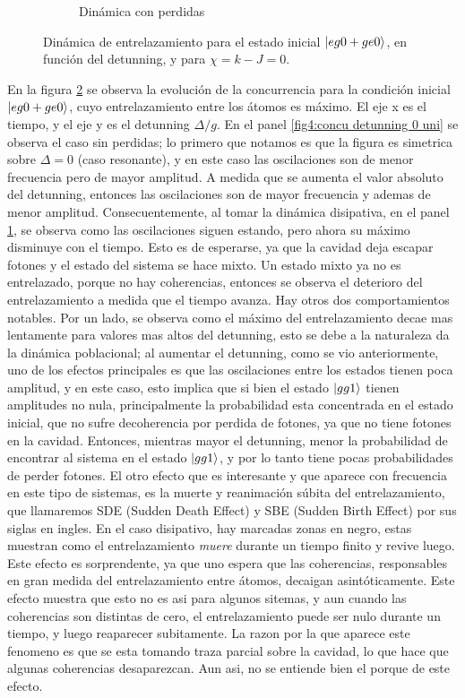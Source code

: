 \begin{figure}[h]
\begin{subfigure}{0.49\textwidth}
        \caption{Dinámica con perdidas}
        \label{fig4:concu detunning 0 dis}
    \end{subfigure}
    \caption{Dinámica de entrelazamiento para el estado inicial $\ket{eg0+ge0}$, en función del detunning, y para $\chi=k-J=0$.}
    \label{fig4:concu detunning 0}
\end{figure}
En la figura \ref{fig4:concu detunning 0} se observa la evolución de la concurrencia para la condición inicial $\ket{eg0+ge0}$, cuyo entrelazamiento entre los átomos es máximo. El eje x es el tiempo, y el eje y es el detunning $\Delta/g$. En el panel \ref{fig4:concu detunning 0 uni} se observa el caso sin perdidas; lo primero que notamos es que la figura es simetrica sobre $\Delta=0$ (caso resonante), y en este caso las oscilaciones son de menor frecuencia pero de mayor amplitud. A medida que se aumenta el valor absoluto del detunning, entonces las oscilaciones son de mayor frecuencia y ademas de menor amplitud. Consecuentemente, al tomar la dinámica disipativa, en el panel \ref{fig4:concu detunning 0 dis}, se observa como las oscilaciones siguen estando, pero ahora su máximo disminuye con el tiempo. Esto es de esperarse, ya que la cavidad deja escapar fotones y el estado del sistema se hace mixto. Un estado mixto ya no es entrelazado, porque no hay coherencias, entonces se observa el deterioro del entrelazamiento a medida que el tiempo avanza. Hay otros dos comportamientos notables. Por un lado, se observa como el máximo del entrelazamiento decae mas lentamente para valores mas altos del detunning, esto se debe a la naturaleza da la dinámica poblacional; al aumentar el detunning, como se vio anteriormente, uno de los efectos principales es que las oscilaciones entre los estados tienen poca amplitud, y en este caso, esto implica que si bien el estado $\ket{gg1}$ tienen amplitudes no nula, principalmente la probabilidad esta concentrada en el estado inicial, que no sufre decoherencia por perdida de fotones, ya que no tiene fotones en la cavidad. Entonces, mientras mayor el detunning, menor la probabilidad de encontrar al sistema en el estado $\ket{gg1}$, y por lo tanto tiene pocas probabilidades de perder fotones. El otro efecto que es interesante y que aparece con frecuencia en este tipo de sistemas, es la muerte y reanimación súbita del entrelazamiento, que llamaremos SDE (Sudden Death Effect) y SBE (Sudden Birth Effect) por sus siglas en ingles. En el caso disipativo, hay marcadas zonas en negro, estas muestran como el entrelazamiento \textit{muere} durante un tiempo finito y revive luego. Este efecto es sorprendente, ya que uno espera que las coherencias, responsables en gran medida del entrelazamiento entre átomos, decaigan asintóticamente. Este efecto muestra que esto no es asi para algunos sitemas, y aun cuando las coherencias son distintas de cero, el entrelazamiento puede ser nulo durante un tiempo, y luego reaparecer subitamente. La razon por la que aparece este fenomeno es que se esta tomando traza parcial sobre la cavidad, lo que hace que algunas coherencias desaparezcan. Aun asi, no se entiende bien el porque de este efecto.

